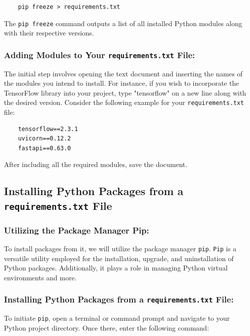 \begin{verbatim}
	pip freeze > requirements.txt
\end{verbatim}

The \texttt{pip freeze} command outputs a list of all installed Python modules along with their respective versions.

\subsubsection{Adding Modules to Your \texttt{requirements.txt} File:}

The initial step involves opening the text document and inserting the names of the modules you intend to install. For instance, if you wish to incorporate the TensorFlow library into your project, type "tensorflow" on a new line along with the desired version. Consider the following example for your \texttt{requirements.txt} file:

\begin{verbatim}
	tensorflow==2.3.1
	uvicorn==0.12.2
	fastapi==0.63.0
\end{verbatim}

After including all the required modules, save the document.

\subsection{Installing Python Packages from a \texttt{requirements.txt} File}

\subsubsection{Utilizing the Package Manager Pip:}

To install packages from it, we will utilize the package manager \texttt{pip}. \texttt{Pip} is a versatile utility employed for the installation, upgrade, and uninstallation of Python packages. Additionally, it plays a role in managing Python virtual environments and more.

\subsubsection{Installing Python Packages from a \texttt{requirements.txt} File:}

To initiate \texttt{pip}, open a terminal or command prompt and navigate to your Python project directory. Once there, enter the following command:

